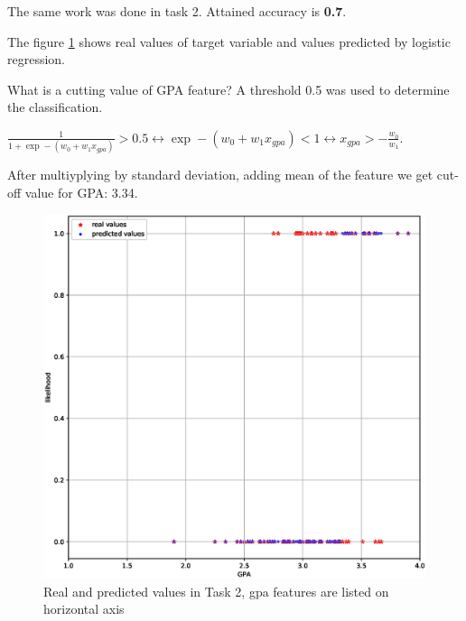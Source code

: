 \documentclass{article}
\begin{document}
The same work was done in task 2. Attained accuracy is {\bfseries 0.7}.

The figure \ref{gpa_plot} shows real values of target variable and values predicted by logistic regression.

What is a cutting value of GPA feature? A threshold 0.5 was used to determine the classification. 

$\frac{1}{1 + \exp-(w_0 + w_1 x_{gpa})} > 0.5 \leftrightarrow \exp-(w_0 + w_1 x_{gpa}) < 1 \leftrightarrow \boxed{x_{gpa} > -\frac{w_0}{w_1}}$. 

After multiyplying by standard deviation, adding mean of the feature we get cut-off value for GPA: 3.34.

\begin{figure}
	\includegraphics[width=\linewidth]{gpa_feat_plot}
	\caption{Real and predicted values in Task 2, gpa features are listed on horizontal axis}\label{gpa_plot}
\end{figure}
\end{document}
